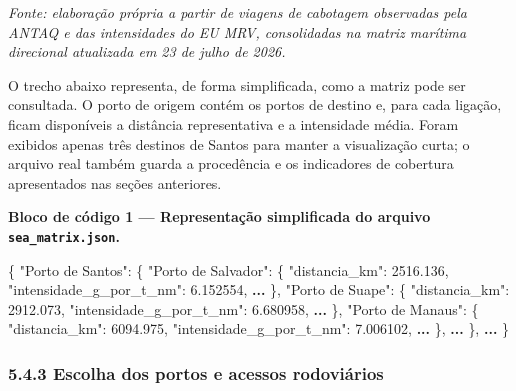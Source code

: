 \documentclass[brazil,]{article}
\newenvironment{Shaded}{}{}
\newcommand{\DataTypeTok}[1]{\textcolor[rgb]{0.56,0.13,0.00}{#1}}
\newcommand{\ErrorTok}[1]{\textcolor[rgb]{1.00,0.00,0.00}{\textbf{#1}}}
\newcommand{\FloatTok}[1]{\textcolor[rgb]{0.25,0.63,0.44}{#1}}
\newcommand{\FunctionTok}[1]{\textcolor[rgb]{0.02,0.16,0.49}{#1}}
\let\oldsubsubsection\subsubsection
\renewcommand{\subsubsection}{\Needspace{10\baselineskip}\oldsubsubsection}
\begin{document}
\emph{Fonte: elaboração própria a partir de viagens de cabotagem
observadas pela ANTAQ e das intensidades do EU MRV, consolidadas na
matriz marítima direcional atualizada em 23 de julho de 2026.}

O trecho abaixo representa, de forma simplificada, como a matriz pode
ser consultada. O porto de origem contém os portos de destino e, para
cada ligação, ficam disponíveis a distância representativa e a
intensidade média. Foram exibidos apenas três destinos de Santos para
manter a visualização curta; o arquivo real também guarda a procedência
e os indicadores de cobertura apresentados nas seções anteriores.

\begin{samepage}
\textbf{Bloco de código 1 --- Representação simplificada do arquivo
\texttt{sea\_matrix.json}.}

\begin{Shaded}
\begin{Highlighting}[]
\FunctionTok{\{}
    \DataTypeTok{"Porto de Santos"}\FunctionTok{:} \FunctionTok{\{}
        \DataTypeTok{"Porto de Salvador"}\FunctionTok{:} \FunctionTok{\{}
            \DataTypeTok{"distancia_km"}\FunctionTok{:} \FloatTok{2516.136}\FunctionTok{,}
            \DataTypeTok{"intensidade_g_por_t_nm"}\FunctionTok{:} \FloatTok{6.152554}\FunctionTok{,}
            \ErrorTok{...}
        \FunctionTok{\},}
    \DataTypeTok{"Porto de Suape"}\FunctionTok{:} \FunctionTok{\{}
        \DataTypeTok{"distancia_km"}\FunctionTok{:} \FloatTok{2912.073}\FunctionTok{,}
        \DataTypeTok{"intensidade_g_por_t_nm"}\FunctionTok{:} \FloatTok{6.680958}\FunctionTok{,}
        \ErrorTok{...}
    \FunctionTok{\},}
    \DataTypeTok{"Porto de Manaus"}\FunctionTok{:} \FunctionTok{\{}
      \DataTypeTok{"distancia_km"}\FunctionTok{:} \FloatTok{6094.975}\FunctionTok{,}
      \DataTypeTok{"intensidade_g_por_t_nm"}\FunctionTok{:} \FloatTok{7.006102}\FunctionTok{,}
      \ErrorTok{...}
    \FunctionTok{\},}
    \ErrorTok{...}
  \FunctionTok{\},}
\ErrorTok{...}
\FunctionTok{\}}
\end{Highlighting}
\end{Shaded}
\end{samepage}

\hypertarget{escolha-dos-portos-e-acessos-rodoviuxe1rios}{%
\subsubsection{5.4.3 Escolha dos portos e acessos
rodoviários}\label{escolha-dos-portos-e-acessos-rodoviuxe1rios}}
\end{document}
